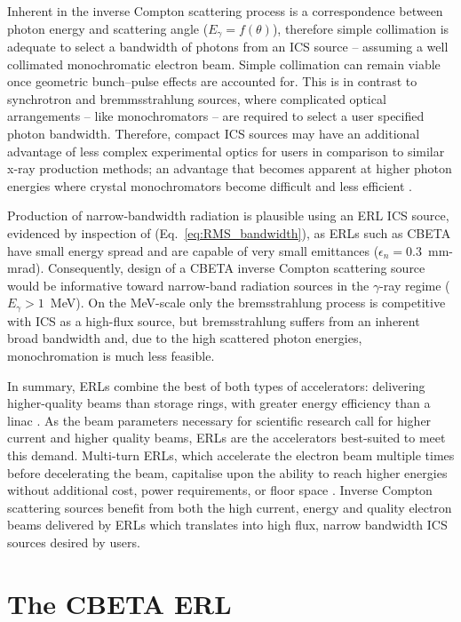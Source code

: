 \documentclass[../main.tex]{subfiles}
\begin{document}
Inherent in the inverse Compton scattering process is a correspondence between photon energy and scattering angle ($E_{\gamma} = f\left(\theta\right)$), therefore simple collimation is adequate to select a bandwidth of photons from an ICS source -- assuming a well collimated monochromatic electron beam. Simple collimation can remain viable once geometric bunch--pulse effects are accounted for. This is in contrast to synchrotron and bremmsstrahlung sources, where complicated optical arrangements -- like monochromators -- are required to select a user specified photon bandwidth. Therefore, compact ICS sources may have an additional advantage of less complex experimental optics for users in comparison to similar x-ray production methods; an advantage that becomes apparent at higher photon energies where crystal monochromators become difficult and less efficient \cite{lienert1998focusing}. 
 
Production of narrow-bandwidth radiation is plausible using an ERL ICS source, evidenced by inspection of (Eq.~\ref{eq:RMS_bandwidth}), as ERLs such as CBETA have small energy spread and are capable of very small emittances ($\epsilon_{n} = 0.3$~\si{\milli\meter}-\si{\milli\radian}). Consequently, design of a CBETA inverse Compton scattering source would be informative toward narrow-band radiation sources in the $\gamma$-ray regime ($E_{\gamma} > 1$~\si{\mega\electronvolt}). On the \si{\mega\electronvolt}-scale only the bremsstrahlung process is competitive with ICS as a high-flux source, but bremsstrahlung suffers from an inherent broad bandwidth and, due to the high scattered photon energies, monochromation is much less feasible.

In summary, ERLs combine the best of both types of accelerators: delivering higher-quality beams than storage rings, with greater energy efficiency than a linac \cite{smith2006optic}. As the beam parameters necessary for scientific research call for higher current and higher quality beams, ERLs are the accelerators best-suited to meet this demand. Multi-turn ERLs, which accelerate the electron beam multiple times before decelerating the beam, capitalise upon the ability to reach higher energies without additional cost, power requirements, or floor space \cite{merminga2003high}. Inverse Compton scattering sources benefit from both the high current, energy and quality electron beams delivered by ERLs which translates into high flux, narrow bandwidth ICS sources desired by users. 

\section{The CBETA ERL}
\label{sec:CBETA_commissioning}
\end{document}
